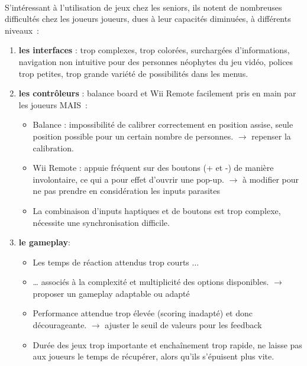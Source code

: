 \paragraph{}
S'intéressant à l'utilisation de jeux chez les seniors, ils notent de nombreuses difficultés chez les joueurs joueurs, dues à leur capacités diminuées, à différents niveaux~:
\begin{enumerate}
	\item \textbf{les interfaces} : trop complexes, trop colorées, surchargées d'informations, navigation non intuitive pour des personnes néophytes du jeu vidéo, polices trop petites, trop grande variété de possibilités dans les menus.
	\item \textbf{les contrôleurs} : balance board et Wii Remote facilement pris en main par les joueurs MAIS~:
	\begin{itemize}
		\item Balance : impossibilité de calibrer correctement en position assise, seule position possible pour un certain nombre de personnes. \newline
		$\rightarrow$ repenser la calibration.
		\item  Wii Remote : appuie fréquent sur des boutons (+ et -) de manière involontaire, ce qui a pour effet d'ouvrir une pop-up.\newline
		$\rightarrow$ à modifier pour ne pas prendre en considération les inputs parasites
		\item La combinaison d'inputs haptiques et de boutons est trop complexe, nécessite une synchronisation difficile.
	\end{itemize}
	\item \textbf{le gameplay}:
	\begin{itemize}
		\item Les temps de réaction attendus trop courts ...
		\item … associés à la complexité et multiplicité des options disponibles.\newline
		$\rightarrow$ proposer un gameplay adaptable ou adapté
		\item Performance attendue trop élevée (scoring inadapté) et donc décourageante.\newline
		$\rightarrow$ ajuster le seuil de valeurs pour les feedback
		\item Durée des jeux trop importante et enchaînement trop rapide, ne laisse pas aux joueurs le temps de récupérer, alors qu'ils s'épuisent plus vite.
	\end{itemize}	
\end{enumerate}
